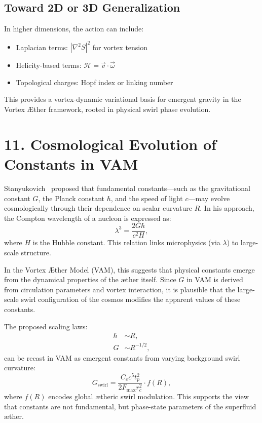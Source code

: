 \documentclass[11pt]{article}
\begin{document}
\subsection*{Toward 2D or 3D Generalization}

In higher dimensions, the action can include:
\begin{itemize}
\item Laplacian terms: $|\nabla^2 S|^2$ for vortex tension
\item Helicity-based terms: $\mathcal{H} = \vec{v} \cdot \vec{\omega}$
\item Topological charges: Hopf index or linking number
\end{itemize}

This provides a vortex-dynamic variational basis for emergent gravity in the Vortex \AE ther framework, rooted in physical swirl phase evolution.

\section*{11. Cosmological Evolution of Constants in VAM}

Stanyukovich~\cite{stanyukovich2008evolution} proposed that fundamental constants—such as the gravitational constant $G$, the Planck constant $\hbar$, and the speed of light $c$—may evolve cosmologically through their dependence on scalar curvature $R$. In his approach, the Compton wavelength of a nucleon is expressed as:
\begin{equation}
\lambda^3 = \frac{2G\hbar}{c^2 H},
\end{equation}
where $H$ is the Hubble constant. This relation links microphysics (via $\lambda$) to large-scale structure.

In the Vortex \AE ther Model (VAM), this suggests that physical constants emerge from the dynamical properties of the æther itself. Since $G$ in VAM is derived from circulation parameters and vortex interaction, it is plausible that the large-scale swirl configuration of the cosmos modifies the apparent values of these constants.

The proposed scaling laws:
\begin{align*}
\hbar &\sim R, \\
G &\sim R^{-1/2},
\end{align*}
can be recast in VAM as emergent constants from varying background swirl curvature:
\begin{equation}
G_\text{swirl} = \frac{C_e c^5 t_p^2}{2 F_\text{max} r_c^2} \cdot f(R),
\end{equation}
where $f(R)$ encodes global ætheric swirl modulation. This supports the view that constants are not fundamental, but phase-state parameters of the superfluid æther.
\end{document}
